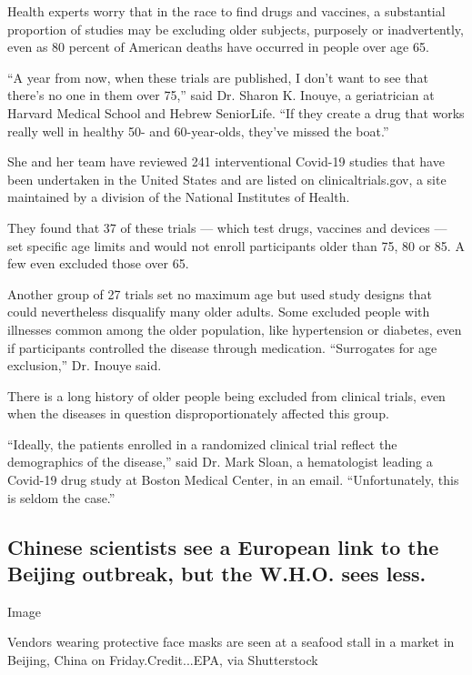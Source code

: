 Health experts worry that in the race to find drugs and vaccines, a
substantial proportion of studies may be excluding older subjects,
purposely or inadvertently, even as 80 percent of American deaths have
occurred in people over age 65.

``A year from now, when these trials are published, I don't want to see
that there's no one in them over 75,'' said Dr. Sharon K. Inouye, a
geriatrician at Harvard Medical School and Hebrew SeniorLife. ``If they
create a drug that works really well in healthy 50- and 60-year-olds,
they've missed the boat.''

She and her team have reviewed 241 interventional Covid-19 studies that
have been undertaken in the United States and are listed on
clinicaltrials.gov, a site maintained by a division of the National
Institutes of Health.

They found that 37 of these trials --- which test drugs, vaccines and
devices --- set specific age limits and would not enroll participants
older than 75, 80 or 85. A few even excluded those over 65.

Another group of 27 trials set no maximum age but used study designs
that could nevertheless disqualify many older adults. Some excluded
people with illnesses common among the older population, like
hypertension or diabetes, even if participants controlled the disease
through medication. ``Surrogates for age exclusion,'' Dr. Inouye said.

There is a long history of older people being excluded from clinical
trials, even when the diseases in question disproportionately affected
this group.

``Ideally, the patients enrolled in a randomized clinical trial reflect
the demographics of the disease,'' said Dr. Mark Sloan, a hematologist
leading a Covid-19 drug study at Boston Medical Center, in an email.
``Unfortunately, this is seldom the case.''

\hypertarget{chinese-scientists-see-a-european-link-to-the-beijing-outbreak-but-the-who-sees-less}{%
\subsection{Chinese scientists see a European link to the Beijing
outbreak, but the W.H.O. sees
less.}\label{chinese-scientists-see-a-european-link-to-the-beijing-outbreak-but-the-who-sees-less}}

Image

Vendors wearing protective face masks are seen at a seafood stall in a
market in Beijing, China on Friday.Credit...EPA, via Shutterstock

